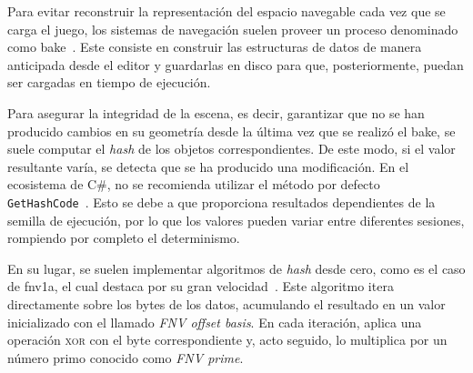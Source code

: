 Para evitar reconstruir la representación del espacio navegable cada vez que se carga el juego, los sistemas de navegación suelen proveer un proceso denominado como \gls{bake}~\cite{RecastNavigation, UnityNavMesh, UnrealNavSystem}.
Este consiste en construir las estructuras de datos de manera anticipada desde el editor y guardarlas en disco para que, posteriormente, puedan ser cargadas en tiempo de ejecución.

Para asegurar la integridad de la escena, es decir, garantizar que no se han producido cambios en su geometría desde la última vez que se realizó el \gls{bake}, se suele computar el \textit{hash} de los objetos correspondientes.
De este modo, si el valor resultante varía, se detecta que se ha producido una modificación.
En el ecosistema de C\#, no se recomienda utilizar el método por defecto \texttt{GetHashCode}~\cite{csharp_gethashcode}.
Esto se debe a que proporciona resultados dependientes de la semilla de ejecución, por lo que los valores pueden variar entre diferentes sesiones, rompiendo por completo el determinismo.

En su lugar, se suelen implementar algoritmos de \textit{hash} desde cero, como es el caso de \gls{fnv1a}, el cual destaca por su gran velocidad~\cite{fnv_hash}.
Este algoritmo itera directamente sobre los bytes de los datos, acumulando el resultado en un valor inicializado con el llamado \textit{FNV offset basis}.
En cada iteración, aplica una operación \textsc{xor} con el byte correspondiente y, acto seguido, lo multiplica por un número primo conocido como \textit{FNV prime}.
